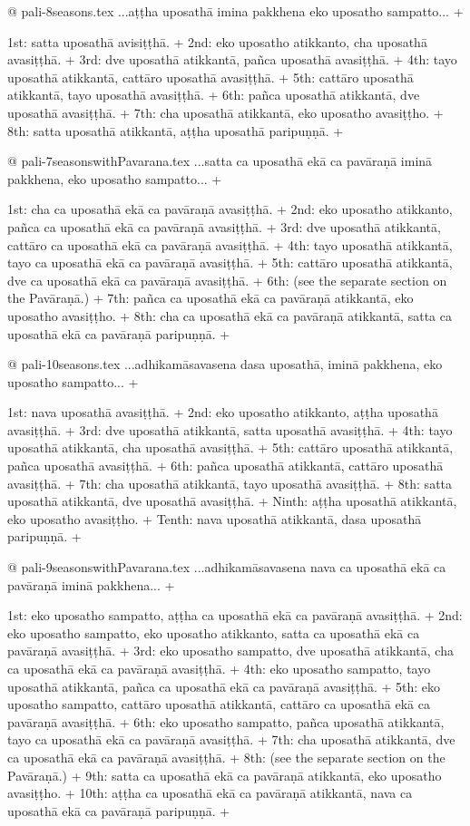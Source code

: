 @ pali-8seasons.tex
...aṭṭha uposathā imina pakkhena eko uposatho sampatto... +

1st: satta uposathā avisiṭṭhā. +
2nd: eko uposatho atikkanto, cha uposathā avasiṭṭhā. +
3rd: dve uposathā atikkantā, pañca uposathā avasiṭṭhā. +
4th: tayo uposathā atikkantā, cattāro uposathā avasiṭṭhā. +
5th: cattāro uposathā atikkantā, tayo uposathā avasiṭṭhā. +
6th: pañca uposathā atikkantā, dve uposathā avasiṭṭhā. +
7th: cha uposathā atikkantā, eko uposatho avasiṭṭho. +
8th: satta uposathā atikkantā, aṭṭha uposathā paripuṇṇā. +

@ pali-7seasonswithPavarana.tex
...satta ca uposathā ekā ca pavāraṇā iminā pakkhena, eko uposatho sampatto... +

1st: cha ca uposathā ekā ca pavāraṇā avasiṭṭhā. +
2nd: eko uposatho atikkanto, pañca ca uposathā ekā ca pavāraṇā avasiṭṭhā. +
3rd: dve uposathā atikkantā, cattāro ca uposathā ekā ca pavāraṇā avasiṭṭhā. +
4th: tayo uposathā atikkantā, tayo ca uposathā ekā ca pavāraṇā avasiṭṭhā. +
5th: cattāro uposathā atikkantā, dve ca uposathā ekā ca pavāraṇā avasiṭṭhā. +
6th: (see the separate section on the Pavāraṇā.) +
7th: pañca ca uposathā ekā ca pavāraṇā atikkantā, eko uposatho avasiṭṭho. +
8th: cha ca uposathā ekā ca pavāraṇā atikkantā, satta ca uposathā ekā ca pavāraṇā paripuṇṇā. +

@ pali-10seasons.tex
...adhikamāsavasena dasa uposathā, iminā pakkhena, eko uposatho sampatto... +

1st: nava uposathā avasiṭṭhā. +
2nd: eko uposatho atikkanto, aṭṭha uposathā avasiṭṭhā. +
3rd: dve uposathā atikkantā, satta uposathā avasiṭṭhā. +
4th: tayo uposathā atikkantā, cha uposathā avasiṭṭhā. +
5th: cattāro uposathā atikkantā, pañca uposathā avasiṭṭhā. +
6th: pañca uposathā atikkantā, cattāro uposathā avasiṭṭhā. +
7th: cha uposathā atikkantā, tayo uposathā avasiṭṭhā. +
8th: satta uposathā atikkantā, dve uposathā avasiṭṭhā. +
Ninth: aṭṭha uposathā atikkantā, eko uposatho avasiṭṭho. +
Tenth: nava uposathā atikkantā, dasa uposathā paripuṇṇā. +

@ pali-9seasonswithPavarana.tex
...adhikamāsavasena nava ca uposathā ekā ca pavāraṇā iminā pakkhena... +

1st: eko uposatho sampatto, aṭṭha ca uposathā ekā ca pavāraṇā avasiṭṭhā. +
2nd: eko uposatho sampatto, eko uposatho atikkanto, satta ca uposathā ekā ca pavāraṇā avasiṭṭhā. +
3rd: eko uposatho sampatto, dve uposathā atikkantā, cha ca uposathā ekā ca pavāraṇā avasiṭṭhā. +
4th: eko uposatho sampatto, tayo uposathā atikkantā, pañca ca uposathā ekā ca pavāraṇā avasiṭṭhā. +
5th:  eko uposatho sampatto, cattāro uposathā atikkantā, cattāro ca uposathā ekā ca pavāraṇā avasiṭṭhā. +
6th:  eko uposatho sampatto, pañca uposathā atikkantā, tayo ca uposathā ekā ca pavāraṇā avasiṭṭhā. +
7th: cha uposathā atikkantā, dve ca uposathā ekā ca pavāraṇā avasiṭṭhā. +
8th: (see the separate section on the Pavāraṇā.) +
9th: satta ca uposathā ekā ca pavāraṇā atikkantā, eko uposatho avasiṭṭho. +
10th: aṭṭha ca uposathā ekā ca pavāraṇā atikkantā, nava ca uposathā ekā ca pavāraṇā paripuṇṇā. +
